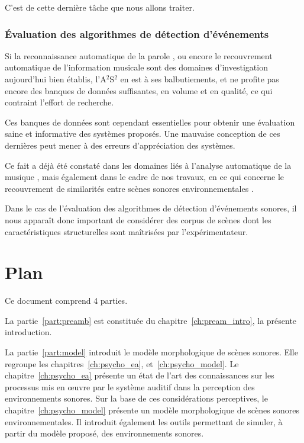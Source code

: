 C'est de cette dernière tâche que nous allons traiter.

\subsubsection{Évaluation des algorithmes de détection d'événements}

Si la reconnaissance automatique de la parole \citep{Rabiner93}, ou encore le recouvrement automatique de l'information musicale \citep{Muller07} sont des domaines d'investigation aujourd'hui bien établis, l'A$^2$S$^2$ en est à ses balbutiements, et ne profite pas encore des banques de données suffisantes, en volume et en qualité, ce qui contraint l'effort de recherche.

Ces banques de données sont cependant essentielles pour obtenir une évaluation saine et informative des systèmes proposés. Une mauvaise conception de ces dernières peut mener à des erreurs d’appréciation des systèmes. 

Ce fait a déjà été constaté dans les domaines liés à l’analyse automatique de la musique \citep{sturm2014simple}, mais également dans le cadre de nos travaux, en ce qui concerne le recouvrement de similarités entre scènes sonores environnementales \citep{lafay2016JAES}.

Dans le cas de l’évaluation des algorithmes de détection d'événements sonores, il nous apparaît donc important de considérer des corpus de scènes dont les caractéristiques structurelles sont maîtrisées par l'expérimentateur. 


\section{Plan}

Ce document comprend 4 parties.

La partie~\ref{part:preamb} est constituée du chapitre~\ref{ch:pream_intro}, la présente introduction.

La partie~\ref{part:model} introduit le modèle morphologique de scènes sonores. Elle regroupe les chapitres~\ref{ch:psycho_ea}, et~\ref{ch:psycho_model}. Le chapitre~\ref{ch:psycho_ea} présente un état de l'art des connaissances sur les processus mis en œuvre par le système auditif dans la perception des environnements sonores. Sur la base de ces considérations perceptives, le chapitre~\ref{ch:psycho_model} présente un modèle morphologique de scènes sonores environnementales. Il introduit également les outils permettant de simuler, à partir du modèle proposé, des environnements sonores.

